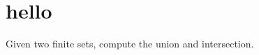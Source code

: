 \section{hello}


\begin{exercise}
Given two finite sets, compute the union and intersection.
\end{exercise}


